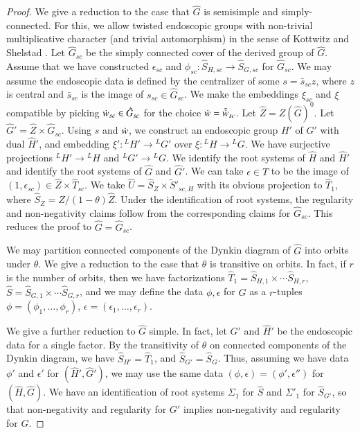 \begin{proof}
  We give a reduction to the case that $\hat G$ is semisimple and
  simply-connected.  For this, we allow twisted endoscopic groups with
  non-trivial multiplicative character (and trivial automorphism) in
  the sense of Kottwitz and Shelstad \cite{kottwitz1999foundations}.
  Let $\hat G_{sc}$ be the simply connected cover of the derived group
  of $\hat G$.  Assume that we have constructed $\epsilon_{sc}$ and
  $\phi_{sc}:\hat S_{H,sc}\to \hat S_{G,sc}$ for $\hat G_{sc}$.  We
  may assume the endoscopic data is defined by the centralizer of some
  $s = \bar s_{sc} z$, where $z$ is central and $\bar s_{sc}$ is the
  image of $s_{sc}\in \hat G_{sc}$.  We make the embeddings $\xi_{sc}$
  and $\xi$ compatible by picking $\dot w _{sc}\in \hat G_{sc}$ for the
  choice $\dot w =\bar {\dot w} _{sc}$.  Let $\hat Z = Z(\hat G)^0$.  Let
  $\hat G' = \hat Z\times \hat G_{sc}$.  Using $s$ and $\dot w$, we
  construct an endoscopic group $H'$ of $G'$ with dual $\hat H'$, and
  embedding $\xi':{}^LH' \to {}^LG'$ over $\xi:{}^LH\to {}^LG$.  We
  have surjective projections ${}^LH'\to {}^LH$ and ${}^LG'\to {}^LG$.
  We identify the root systems of $\hat H$ and $\hat H'$ and identify
  the root systems of $\hat G$ and $\hat G'$.  We can take
  $\epsilon\in \hat T$ to be the image of $(1,\epsilon_{sc})\in \hat
  Z\times \hat T_{sc}$.  We take $\hat U = \hat S_Z\times \tilde
  S'_{sc,H}$ with its obvious projection to $\hat T_1$, where $\hat
  S_Z = \hat Z/(1-\theta)\hat Z$.  Under the identification of root
  systems, the regularity and non-negativity claims follow from the
  corresponding claims for $\hat G_{sc}$.  This reduces the proof to
  $\hat G = \hat G_{sc}$.

  We may partition connected components of the Dynkin diagram of $\hat
  G$ into orbits under $\theta$.  We give a reduction to the case that
  $\theta$ is transitive on orbits.  In fact, if $r$ is the number of
  orbits, then we have factorizations $\hat T_1 = \hat S_{H,1}
  \times\cdots \hat S_{H,r}$, $\hat S = \hat S_{G,1}\times\cdots \hat
  S_{G,r}$, and we may define the data $\phi,\epsilon$ for $\hat G$ as
  a $r$-tuples $\phi = (\phi_1,\ldots,\phi_r)$, $\epsilon =
  (\epsilon_{1},\ldots,\epsilon_{r})$.

  We give a further reduction to $\hat G$ simple.  In fact, let $\hat
  G'$ and $\hat H'$ be the endoscopic data for a single factor.  By
  the transitivity of $\theta$ on connected components of the Dynkin
  diagram, we have $\hat S_{H'} = \hat T_1$, and $\hat S_{G'} = \hat
  S_{G}$.  Thus, assuming we have data $\phi'$ and $\epsilon'$ for
  $(\hat H',\hat G')$, we may use the same data
  $(\phi,\epsilon)=(\phi',\epsilon'')$ for $(\hat H,\hat G)$.  We have
  an identification of root systems $\Sigma_1$ for $\hat S$ and
  $\Sigma'_1$ for $\hat S_{G'}$, so that non-negativity and regularity
  for $G'$ implies non-negativity and regularity for $G$.


\end{proof}
